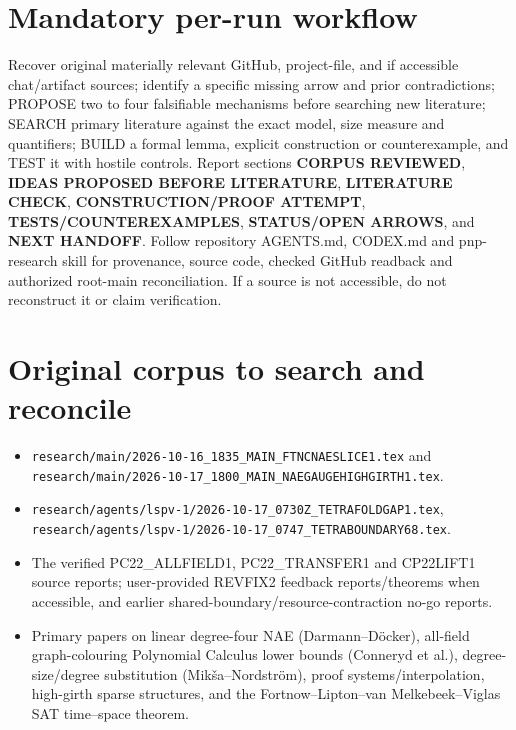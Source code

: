 \documentclass[11pt]{article}
\begin{document}
\section*{Mandatory per-run workflow}
Recover original materially relevant GitHub, project-file, and if accessible chat/artifact sources; identify a specific missing arrow and prior contradictions; PROPOSE two to four falsifiable mechanisms before searching new literature; SEARCH primary literature against the exact model, size measure and quantifiers; BUILD a formal lemma, explicit construction or counterexample, and TEST it with hostile controls. Report sections \textbf{CORPUS REVIEWED}, \textbf{IDEAS PROPOSED BEFORE LITERATURE}, \textbf{LITERATURE CHECK}, \textbf{CONSTRUCTION/PROOF ATTEMPT}, \textbf{TESTS/COUNTEREXAMPLES}, \textbf{STATUS/OPEN ARROWS}, and \textbf{NEXT HANDOFF}. Follow repository AGENTS.md, CODEX.md and pnp-research skill for provenance, source code, checked GitHub readback and authorized root-main reconciliation. If a source is not accessible, do not reconstruct it or claim verification.

\section*{Original corpus to search and reconcile}
\begin{itemize}
\item \texttt{research/main/2026-10-16\_1835\_MAIN\_FTNCNAESLICE1.tex} and \texttt{research/main/2026-10-17\_1800\_MAIN\_NAEGAUGEHIGHGIRTH1.tex}.
\item \texttt{research/agents/lspv-1/2026-10-17\_0730Z\_TETRAFOLDGAP1.tex}, \texttt{research/agents/lspv-1/2026-10-17\_0747\_TETRABOUNDARY68.tex}.
\item The verified PC22\_ALLFIELD1, PC22\_TRANSFER1 and CP22LIFT1 source reports; user-provided REVFIX2 feedback reports/theorems when accessible, and earlier shared-boundary/resource-contraction no-go reports.
\item Primary papers on linear degree-four NAE (Darmann--D\"ocker), all-field graph-colouring Polynomial Calculus lower bounds (Conneryd et al.), degree-size/degree substitution (Mik\v{s}a--Nordstr\"om), proof systems/interpolation, high-girth sparse structures, and the Fortnow--Lipton--van Melkebeek--Viglas SAT time--space theorem.
\end{itemize}
\end{document}
